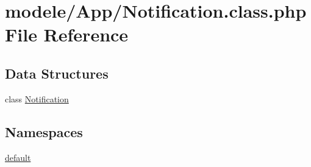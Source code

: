 \hypertarget{_notification_8class_8php}{}\section{modele/\+App/\+Notification.class.\+php File Reference}
\label{_notification_8class_8php}
\subsection*{Data Structures}
\begin{DoxyCompactItemize}
\item 
class \hyperlink{class_notification}{Notification}
\end{DoxyCompactItemize}
\subsection*{Namespaces}
\begin{DoxyCompactItemize}
\item 
 \hyperlink{namespacedefault}{default}
\end{DoxyCompactItemize}
